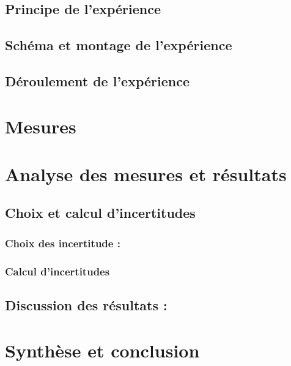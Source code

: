 \documentclass[12pt,a4paper]{article}
\begin{document}
    \subsection{Principe de l'expérience}
    \subsection{Schéma et montage de l’expérience}
    \subsection{Déroulement de l'expérience}
    \section{Mesures}
    \section{Analyse des mesures et résultats}
    \subsection{Choix et calcul d'incertitudes}
    \subsubsection{Choix des incertitude :}
    \subsubsection{Calcul d'incertitudes}
    \subsection{Discussion des résultats :}
    \section{Synthèse et conclusion}
\end{document}
